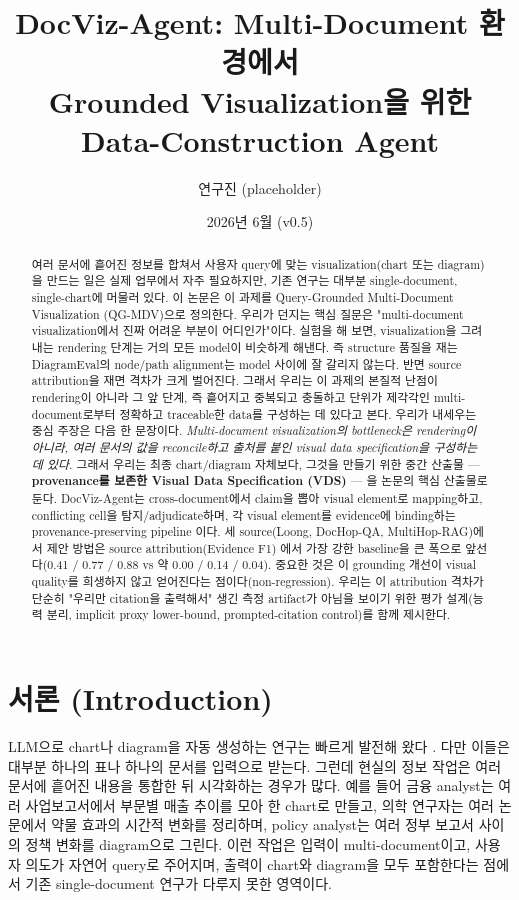 \documentclass[11pt]{article}
\title{DocViz-Agent: Multi-Document 환경에서 \\
       Grounded Visualization을 위한 Data-Construction Agent}
\author{연구진 (placeholder)}
\date{2026년 6월 (v0.5)}
\begin{document}
\maketitle

\begin{abstract}
여러 문서에 흩어진 정보를 합쳐서 사용자 query에 맞는 visualization(chart 또는 diagram)을
만드는 일은 실제 업무에서 자주 필요하지만, 기존 연구는 대부분 single-document, single-chart에
머물러 있다. 이 논문은 이 과제를 Query-Grounded Multi-Document Visualization (QG-MDV)으로
정의한다. 우리가 던지는 핵심 질문은 "multi-document visualization에서 진짜 어려운 부분이
어디인가"이다. 실험을 해 보면, visualization을 그려내는 rendering 단계는 거의 모든 model이
비슷하게 해낸다. 즉 structure 품질을 재는 DiagramEval의 node/path alignment는 model 사이에
잘 갈리지 않는다. 반면 source attribution을 재면 격차가 크게 벌어진다. 그래서 우리는 이 과제의
본질적 난점이 rendering이 아니라 그 앞 단계, 즉 흩어지고 중복되고 충돌하고 단위가 제각각인
multi-document로부터 정확하고 traceable한 data를 구성하는 데 있다고 본다. 우리가 내세우는 중심 주장은 다음 한 문장이다. \emph{Multi-document visualization의 bottleneck은
rendering이 아니라, 여러 문서의 값을 reconcile하고 출처를 붙인 visual data specification을
구성하는 데 있다.} 그래서 우리는 최종 chart/diagram 자체보다, 그것을 만들기 위한 중간 산출물 —
\textbf{provenance를 보존한 Visual Data Specification (VDS)} — 을 논문의 핵심 산출물로 둔다.
DocViz-Agent는 cross-document에서 claim을 뽑아 visual element로 mapping하고, conflicting cell을
탐지/adjudicate하며, 각 visual element를 evidence에 binding하는 provenance-preserving pipeline
이다. 세 source(Loong, DocHop-QA, MultiHop-RAG)에서 제안 방법은 source attribution(Evidence F1)
에서 가장 강한 baseline을 큰 폭으로 앞선다(0.41 / 0.77 / 0.88 vs 약 0.00 / 0.14 / 0.04). 중요한
것은 이 grounding 개선이 visual quality를 희생하지 않고 얻어진다는 점이다(non-regression). 우리는
이 attribution 격차가 단순히 "우리만 citation을 출력해서" 생긴 측정 artifact가 아님을 보이기
위한 평가 설계(능력 분리, implicit proxy lower-bound, prompted-citation control)를 함께 제시한다.
\end{abstract}

\section{서론 (Introduction)}

LLM으로 chart나 diagram을 자동 생성하는 연구는 빠르게 발전해 왔다 \cite{han2023chartllama,
yang2024chartmimic}. 다만 이들은 대부분 하나의 표나 하나의 문서를 입력으로 받는다. 그런데
현실의 정보 작업은 여러 문서에 흩어진 내용을 통합한 뒤 시각화하는 경우가 많다. 예를 들어 금융
analyst는 여러 사업보고서에서 부문별 매출 추이를 모아 한 chart로 만들고, 의학 연구자는 여러
논문에서 약물 효과의 시간적 변화를 정리하며, policy analyst는 여러 정부 보고서 사이의 정책
변화를 diagram으로 그린다. 이런 작업은 입력이 multi-document이고, 사용자 의도가 자연어 query로
주어지며, 출력이 chart와 diagram을 모두 포함한다는 점에서 기존 single-document 연구가 다루지
못한 영역이다.
\end{document}
